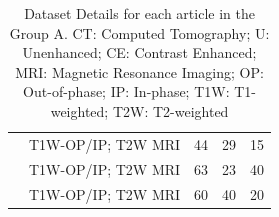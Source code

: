 \documentclass{article}
\begin{document}
\begin{table}[]
\begin{tabular}{ccccc}
        \cite{Schieda2017}                  & T1W-OP/IP; T2W MRI                       & 44                                                 & 29                & 15             \\
        \cite{Tu2020}                       & T1W-OP/IP; T2W MRI                       & 63                                                 & 23                & 40             \\
        \cite{Romeo2018}                    & T1W-OP/IP; T2W MRI                       & 60                                                 & 40                & 20
        \\\bottomrule
    \end{tabular}
    \caption{Dataset Details for each article in the Group A. CT: Computed Tomography; U: Unenhanced; CE: Contrast Enhanced; MRI: Magnetic Resonance Imaging; OP: Out-of-phase; IP: In-phase; T1W: T1-weighted; T2W: T2-weighted}
    \label{tab:data_A}
\end{table}
\end{document}
